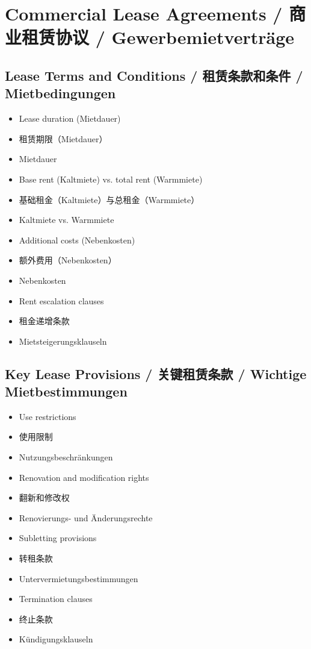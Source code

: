 \section{Commercial Lease Agreements / 商业租赁协议 / Gewerbemietverträge}

\subsection{Lease Terms and Conditions / 租赁条款和条件 / Mietbedingungen}
\begin{itemize}
    \item Lease duration (Mietdauer)
    \item 租赁期限（Mietdauer）
    \item Mietdauer
    \item Base rent (Kaltmiete) vs. total rent (Warmmiete)
    \item 基础租金（Kaltmiete）与总租金（Warmmiete）
    \item Kaltmiete vs. Warmmiete
    \item Additional costs (Nebenkosten)
    \item 额外费用（Nebenkosten）
    \item Nebenkosten
    \item Rent escalation clauses
    \item 租金递增条款
    \item Mietsteigerungsklauseln
\end{itemize}

\subsection{Key Lease Provisions / 关键租赁条款 / Wichtige Mietbestimmungen}
\begin{itemize}
    \item Use restrictions
    \item 使用限制
    \item Nutzungsbeschränkungen
    \item Renovation and modification rights
    \item 翻新和修改权
    \item Renovierungs- und Änderungsrechte
    \item Subletting provisions
    \item 转租条款
    \item Untervermietungsbestimmungen
    \item Termination clauses
    \item 终止条款
    \item Kündigungsklauseln
\end{itemize}

